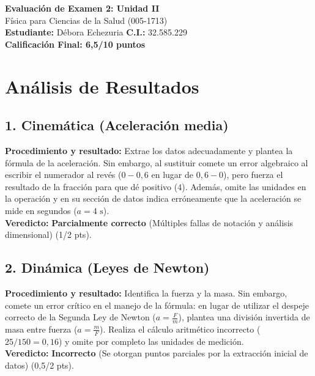 \documentclass[12pt,letterpaper]{article}
\begin{document}
\begin{center}
    \Large \textbf{Evaluación de Examen 2: Unidad II} \\
    \large Física para Ciencias de la Salud (005-1713) \\
    \vspace{0.5cm}
    \textbf{Estudiante:} Débora Echezuria \quad \textbf{C.I.:} 32.585.229
    \vspace{0.3cm} \\
    \large \textbf{Calificación Final: 6,5/10 puntos}
\end{center}

\vspace{0.5cm}

\section*{Análisis de Resultados}

\subsection*{1. Cinemática (Aceleración media)}
\textbf{Procedimiento y resultado:} Extrae los datos adecuadamente y plantea la fórmula de la aceleración. Sin embargo, al sustituir comete un error algebraico al escribir el numerador al revés ($0 - 0,6$ en lugar de $0,6 - 0$), pero fuerza el resultado de la fracción para que dé positivo ($4$). Además, omite las unidades en la operación y en su sección de datos indica erróneamente que la aceleración se mide en segundos ($a = 4 \text{ s}$). \\
\textbf{Veredicto:} \textbf{Parcialmente correcto} (Múltiples fallas de notación y análisis dimensional) (1/2 pts).

\subsection*{2. Dinámica (Leyes de Newton)}
\textbf{Procedimiento y resultado:} Identifica la fuerza y la masa. Sin embargo, comete un error crítico en el manejo de la fórmula: en lugar de utilizar el despeje correcto de la Segunda Ley de Newton ($a = \frac{F}{m}$), plantea una división invertida de masa entre fuerza ($a = \frac{m}{F}$). Realiza el cálculo aritmético incorrecto ($25 / 150 = 0,16$) y omite por completo las unidades de medición. \\
\textbf{Veredicto:} \textbf{Incorrecto} (Se otorgan puntos parciales por la extracción inicial de datos) (0,5/2 pts).
\end{document}
